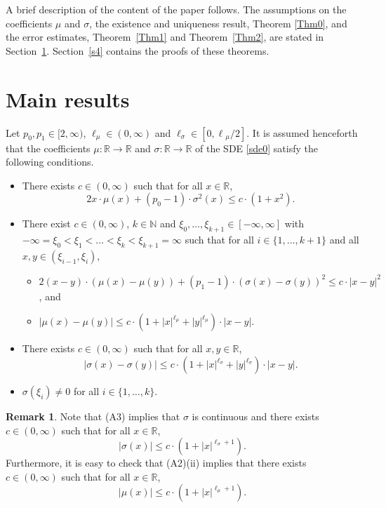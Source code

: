 \documentclass[11pt]{amsart}
\newcommand{\R}{{\mathbb R}}
\newcommand{\N}{{\mathbb N}}
\theoremstyle{plain}
\theoremstyle{definition}
\newtheorem{rem}{Remark}
\begin{document}
A brief description of the content of the paper follows. The  assumptions on the coefficients $\mu$ and $\sigma$, the existence and uniqueness result,  Theorem \ref{Thm0}, and  the error estimates, Theorem~\ref{Thm1} and Theorem~\ref{Thm2}, are stated in Section~\ref{s3}. Section~\ref{s4} contains the
proofs of these theorems.









\section{Main results}\label{s3}



 Let $p_0, p_1\in[2, \infty)$, $\ell_{\mu}\in (0,\infty)$ and $\ell_{\sigma}\in[0,\ell{_\mu}/2]$.
  It is assumed henceforth   that the coefficients $\mu\colon\R\to\R$ and $\sigma\colon\R\to\R$ of the SDE \eqref{sde0} satisfy the following  conditions.
 \begin{itemize}
 \item[(A1)] There exists $c\in(0, \infty)$  such that for all $x\in\R$,
 \[
 2x \cdot \mu(x)+(p_0-1)\cdot \sigma^2(x)\leq c\cdot (1+x^2).
 \]
\item[(A2)] There exist $c\in (0, \infty)$, $k\in\N$ and $\xi_0, \ldots, \xi_{k+1}\in [-\infty,\infty]$ with $-\infty=\xi_0<\xi_1<\ldots < \xi_k <\xi_{k+1}=\infty$ such that
 for all $i\in\{1, \ldots, k+1\}$ and all $x,y\in (\xi_{i-1}, \xi_i)$,\\[-.1cm]
 \begin{itemize}
 \item[(i)]
 $2(x-y)\cdot (\mu(x)-\mu(y))+(p_1-1)\cdot (\sigma(x)-\sigma(y))^2\leq c\cdot |x-y|^2$, and\\[-.2cm]
\item[(ii)]
$|\mu(x)-\mu(y)|\leq c\cdot (1+|x|^{\ell_\mu}+|y|^{\ell_\mu})\cdot |x-y|$.\\[-.1cm]
\end{itemize}
\item[(A3)]  There exists $c\in (0, \infty)$ such that
 for all $x,y\in\R$,
 \[
|\sigma(x)-\sigma(y)|\leq c\cdot (1+|x|^{\ell_{\sigma}}+|y|^{\ell_{\sigma}})\cdot |x-y|.
\]
\item[(A4)]  $\sigma(\xi_i) \neq 0$ for all $i\in\{1,\ldots,k\}$.
\end{itemize}

\begin{rem}\label{rem1}
Note that (A3) implies that  $\sigma$ is continuous and there exists $c\in (0, \infty)$ such that  for all $x\in\R$,
\begin{equation}\label{tmg2}
|\sigma(x)|\leq c\cdot (1+|x|^{\ell_\sigma+1}).
\end{equation}
Furthermore, it is easy to check that (A2)(ii) implies that there exists $c\in (0, \infty)$ such that for all $x\in\R$,
\begin{equation}\label{tmg3}
|\mu(x)|\leq c\cdot (1+|x|^{\ell_\mu+1}).
\end{equation}
\end{rem}
\end{document}
